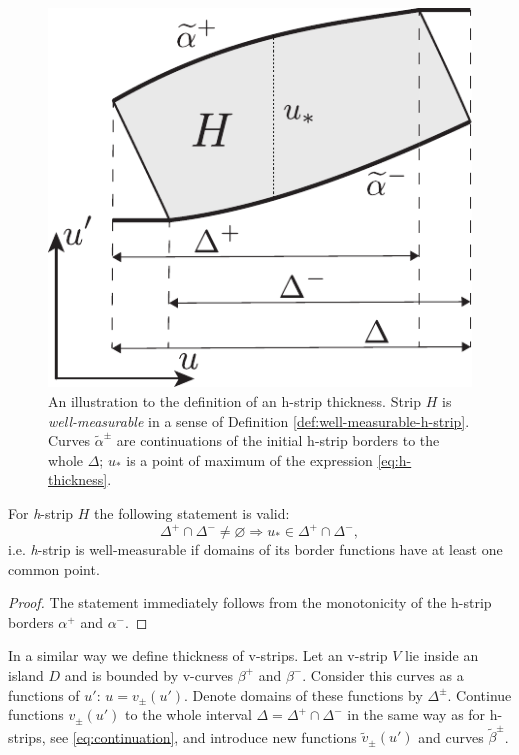 \begin{figure}[h]
\centering
	\includegraphics[scale = 1]{pic/thickness definition}
	\caption{An illustration to the definition of an h-strip thickness. Strip $H$ is {\it well-measurable} in a sense of Definition \ref{def:well-measurable-h-strip}. Curves $\widetilde{\alpha}^{\pm}$ are continuations of the initial h-strip borders to the whole $\Delta$; $u_*$ is a point of maximum of the expression \eqref{eq:h-thickness}.}
\label{fig:thickness-definition}
\end{figure}

\begin{proposition}
\label{prop:h-strip-domains}
	For \emph{h}-strip $H$ the following statement is valid:
	\begin{equation}
		\Delta^+ \cap \Delta^- \neq \varnothing \Rightarrow u_* \in \Delta^+ \cap \Delta^-,
	\end{equation}
	i.e. \emph{h}-strip is well-measurable if domains of its border functions have at least one common point.
\end{proposition}
\begin{proof}
	The statement immediately follows from the monotonicity of the h-strip borders $\alpha^+$ and $\alpha^-$.
\end{proof}

In a similar way we define thickness of v-strips.
Let an v-strip $V$ lie inside an island $D$ and is bounded by v-curves $\beta^+$ and $\beta^-$.
Consider this curves as a functions of $u'$: $u = v_{\pm}(u')$.
Denote domains of these functions by $\Delta^{\pm}$.
Continue functions $v_{\pm}(u')$ to the whole interval $\Delta = \Delta^+ \cap \Delta^-$ in the same way as for h-strips, see \eqref{eq:continuation}, and introduce new functions $\widetilde{v}_{\pm}(u')$ and curves $\widetilde{\beta}^{\pm}$.

